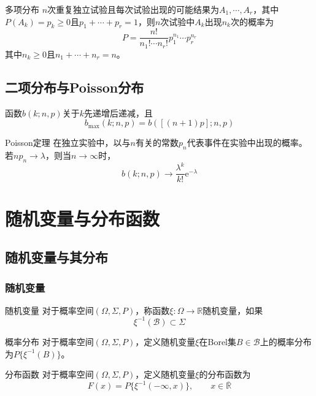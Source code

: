 \documentclass[lang = cn, scheme = chinese, thmcnt = section]{elegantbook}
\newcommand{\R}{\mathbb{R}}            %
\newcommand{\sub}{\subset}             %
\begin{document}
\begin{definition}{多项分布}
	$n$次重复独立试验且每次试验出现的可能结果为$A_1,\cdots,A_r$，其中$P(A_k)=p_k\ge 0$且$p_1+\cdots+p_r=1$，则$n$次试验中$A_k$出现$n_k$次的概率为
	$$
	P=\frac{n!}{n_1!\cdots n_r!}p_1^{n_1}\cdots p_r^{n_r}
	$$
	其中$n_k\ge 0$且$n_1+\cdots+n_r=n$。
\end{definition}

\section{二项分布与Poisson分布}

\begin{proposition}
	函数$b(k;n,p)$关于$k$先递增后递减，且
	$$
	b_{\max}(k;n,p)=b([(n+1)p];n,p)
	$$
\end{proposition}

\begin{theorem}{Poisson定理}
	在独立实验中，以与$n$有关的常数$p_n$代表事件在实验中出现的概率。若$np_n\to\lambda$，则当$n\to\infty$时，
	$$
	b(k;n,p)\to\frac{\lambda^k}{k!}\mathrm{e}^{-\lambda}
	$$
\end{theorem}

\chapter{随机变量与分布函数}

\section{随机变量与其分布}

\subsection{随机变量}

\begin{definition}{随机变量}
	对于概率空间$(\Omega,\Sigma,P)$，称函数$\xi:\Omega\to \R$随机变量，如果
	$$
	\xi^{-1}(\mathscr{B})\sub \Sigma
	$$
\end{definition}

\begin{definition}{概率分布}
	对于概率空间$(\Omega,\Sigma,P)$，定义随机变量$\xi$在Borel集$B\in \mathscr{B}$上的概率分布为$P\{ \xi^{-1}(B) \}$。
\end{definition}

\begin{definition}{分布函数}
	对于概率空间$(\Omega,\Sigma,P)$，定义随机变量$\xi$的分布函数为%
	$$
	F(x)=P\{ \xi^{-1}(-\infty,x) \},\qquad x\in\overline{\R}
	$$
\end{definition}
\end{document}
